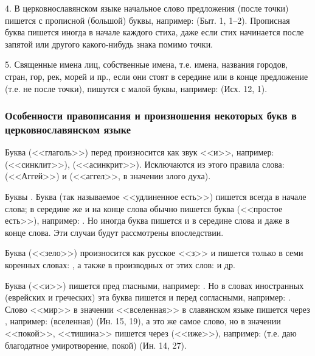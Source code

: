 \documentclass[11pt,a4paper,oneside]{memoir}
\begin{document}
    4. В церковнославянском языке начальное слово предложения (после точки) пишется с прописной (большой) буквы, например: {} (Быт. 1, 1--2). Прописная буква пишется иногда в начале каждого стиха, даже если стих начинается после запятой или другого какого-нибудь знака помимо точки.
    
    5. Священные имена лиц, собственные имена, т.е. имена, названия городов, стран, гор, рек, морей и пр., если они стоят в середине или в конце предложение (т.е. не после точки), пишутся с малой буквы, например: {} (Исх. 12, 1).


                \subsubsection{Особенности правописания и произношения некоторых букв в церковнославянском языке}

    Буква {} (<<глаголь>>) перед {} произносится как звук <<и>>, например: {} (<<синклит>>), {} (<<асинкрит>>). Исключаются из этого правила слова: {} (<<Аггей>>) и {} (<<аггел>>, в значении злого духа).
    
    Буквы {}. Буква {} (так называемое <<удлиненное есть>>) пишется всегда в начале слова; в середине же и на конце слова обычно пишется буква {} (<<простое есть>>), например: {}. Но иногда буква {} пишется и в середине слова и даже в конце слова. Эти случаи будут рассмотрены впоследствии.
    
    Буква {} (<<зело>>) произносится как русское <<з>> и пишется только в семи коренных словах: {}, а также в производных от этих слов: {} и др.
    
    Буква {} (<<и>>) пишется пред гласными, например: {}. Но в словах иностранных (еврейских и греческих) эта буква пишется и перед согласными, например: {}. Слово <<мир>> в значении <<вселенная>> в славянском языке пишется через {}, например: {} (вселенная) (Ин. 15, 19), а это же самое слово, но в значении <<покой>>, <<тишина>> пишется через {} (<<иже>>), например: {} (т.е. даю благодатное умиротворение, покой) (Ин. 14, 27).
    
\end{document}
